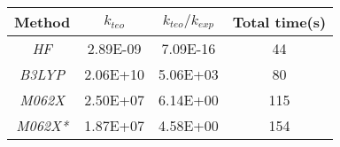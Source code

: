 
\begin{tabular}{|c|c|c|c|}
\hline
\textbf{Method} & \textbf{$k_{teo}$} & \textbf{$k_{teo}/k_{exp}$} & \textbf{Total time(s)} \\ \hline
\textit{HF}     & 2.89E-09        & 7.09E-16           & 44                     \\ \hline
\textit{B3LYP}  & 2.06E+10        & 5.06E+03           & 80                     \\ \hline
\textit{M062X}  & 2.50E+07        & 6.14E+00           & 115                    \\ \hline
\textit{M062X*} & 1.87E+07        & 4.58E+00           & 154                    \\ \hline
\end{tabular}
